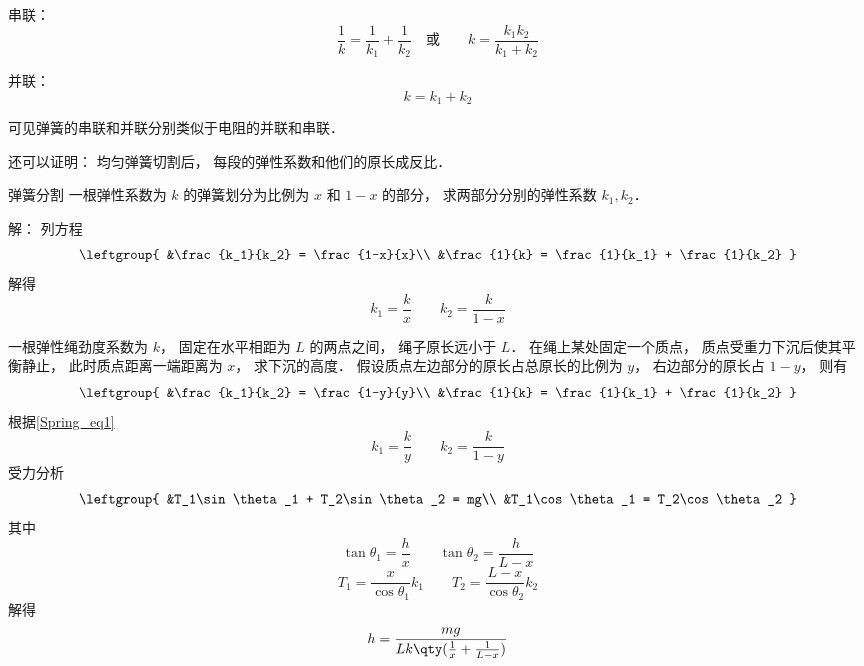 
\begin{issues}
\issueDraft
\end{issues}


串联：
\begin{equation}
\frac{1}{k} = \frac{1}{k_1} + \frac{1}{k_2}
\quad \text{或} \qquad
k = \frac{k_1 k_2}{k_1 + k_2}
\end{equation}

并联：
\begin{equation}
k = k_1 + k_2
\end{equation}

可见弹簧的串联和并联分别类似于电阻的并联和串联．

还可以证明： 均匀弹簧切割后， 每段的弹性系数和他们的原长成反比．


\begin{example}{弹簧分割}
一根弹性系数为 $k$ 的弹簧划分为比例为 $x$ 和 $1-x$ 的部分， 求两部分分别的弹性系数 $k_1, k_2$．

解： 列方程
\begin{equation}
\leftgroup{
&\frac{k_1}{k_2} = \frac{1-x}{x}\\
&\frac{1}{k} = \frac{1}{k_1} + \frac{1}{k_2}
}
\end{equation}
解得
\begin{equation}\label{Spring_eq1}
k_1 = \frac{k}{x} \qquad k_2 = \frac{k}{1-x}
\end{equation}
\end{example}

\begin{example}{}
一根弹性绳劲度系数为 $k$， 固定在水平相距为 $L$ 的两点之间， 绳子原长远小于 $L$． 在绳上某处固定一个质点， 质点受重力下沉后使其平衡静止， 此时质点距离一端距离为 $x$， 求下沉的高度．
假设质点左边部分的原长占总原长的比例为 $y$， 右边部分的原长占 $1-y$， 则有
\begin{equation}
\leftgroup{
&\frac{k_1}{k_2} = \frac{1-y}{y}\\
&\frac{1}{k} = \frac{1}{k_1} + \frac{1}{k_2}
}
\end{equation}
根据\autoref{Spring_eq1}
\begin{equation}
k_1 = \frac{k}{y} \qquad
k_2 = \frac{k}{1-y}
\end{equation}
受力分析
\begin{equation}
\leftgroup{
&T_1\sin\theta_1 + T_2\sin\theta_2 = mg\\
&T_1\cos\theta_1 = T_2\cos\theta_2
}
\end{equation}
其中
\begin{equation}
\tan\theta_1 = \frac{h}{x}
\qquad
\tan\theta_2 = \frac{h}{L-x}
\end{equation}
\begin{equation}
T_1 = \frac{x}{\cos\theta_1} k_1 \qquad
T_2 = \frac{L-x}{\cos\theta_2} k_2
\end{equation}
解得
\begin{equation}
h = \frac{mg}{Lk\qty(\frac{1}{x} + \frac{1}{L-x})}
\end{equation}
\end{example}
